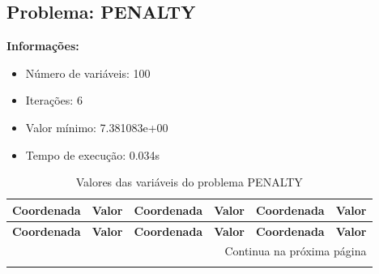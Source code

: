 \documentclass[12pt]{article}
\begin{document}
\newpage            
\subsection{Problema: PENALTY}

\textbf{Informações:}
\begin{itemize}
\item Número de variáveis: 100
\item Iterações: 6
\item Valor mínimo: 7.381083e+00
\item Tempo de execução: 0.034s
\end{itemize}

\small
\begin{longtable}{@{}cc|cc|cc@{}}
\caption{Valores das variáveis do problema PENALTY} \\
\toprule
\textbf{Coordenada} & \textbf{Valor} & \textbf{Coordenada} & \textbf{Valor} & \textbf{Coordenada} & \textbf{Valor} \\
\midrule
\endfirsthead

\toprule
\textbf{Coordenada} & \textbf{Valor} & \textbf{Coordenada} & \textbf{Valor} & \textbf{Coordenada} & \textbf{Valor} \\
\midrule
\endhead

\midrule \multicolumn{6}{r}{{Continua na próxima página}} \\ \midrule
\endfoot


\end{longtable}
\end{document}
